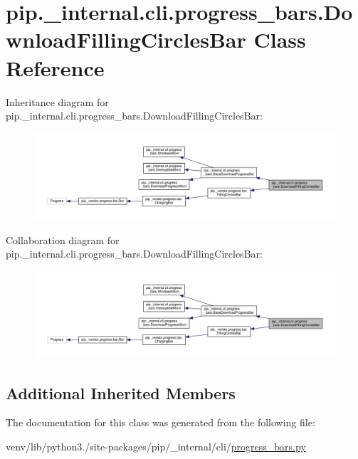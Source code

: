 \hypertarget{classpip_1_1__internal_1_1cli_1_1progress__bars_1_1DownloadFillingCirclesBar}{}\section{pip.\+\_\+internal.\+cli.\+progress\+\_\+bars.\+Download\+Filling\+Circles\+Bar Class Reference}
\label{classpip_1_1__internal_1_1cli_1_1progress__bars_1_1DownloadFillingCirclesBar}


Inheritance diagram for pip.\+\_\+internal.\+cli.\+progress\+\_\+bars.\+Download\+Filling\+Circles\+Bar\+:
\nopagebreak
\begin{figure}[H]
\begin{center}
\leavevmode
\includegraphics[width=350pt]{classpip_1_1__internal_1_1cli_1_1progress__bars_1_1DownloadFillingCirclesBar__inherit__graph}
\end{center}
\end{figure}


Collaboration diagram for pip.\+\_\+internal.\+cli.\+progress\+\_\+bars.\+Download\+Filling\+Circles\+Bar\+:
\nopagebreak
\begin{figure}[H]
\begin{center}
\leavevmode
\includegraphics[width=350pt]{classpip_1_1__internal_1_1cli_1_1progress__bars_1_1DownloadFillingCirclesBar__coll__graph}
\end{center}
\end{figure}
\subsection*{Additional Inherited Members}


The documentation for this class was generated from the following file\+:\begin{DoxyCompactItemize}
\item 
venv/lib/python3./site-\/packages/pip/\+\_\+internal/cli/\hyperlink{progress__bars_8py}{progress\+\_\+bars.\+py}\end{DoxyCompactItemize}
